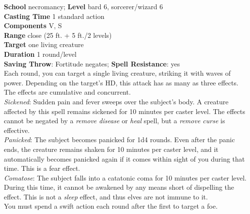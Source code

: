 \textbf{School }necromancy; \textbf{Level }bard 6, sorcerer/wizard 6\\
\textbf{Casting Time }1 standard action\\
\textbf{Components }V, S\\
\textbf{Range }close (25 ft. + 5 ft./2 levels)\\
\textbf{Target }one living creature\\
\textbf{Duration }1 round/level\\
\textbf{Saving Throw}: Fortitude negates; \textbf{Spell Resistance}: yes\\
Each round, you can target a single living creature, striking it with waves of power. Depending on the target's HD, this attack has as many as three effects.\\
The effects are cumulative and concurrent.\\
\textit{Sickened}: Sudden pain and fever sweeps over the subject's body. A creature affected by this spell remains sickened for 10 minutes per caster level. The effects cannot be negated by a \textit{remove disease }or \textit{heal }spell, but a \textit{remove curse }is effective.\\
\textit{Panicked}: The subject becomes panicked for 1d4 rounds. Even after the panic ends, the creature remains shaken for 10 minutes per caster level, and it automatically becomes panicked again if it comes within sight of you during that time. This is a fear effect.\\
\textit{Comatose}: The subject falls into a catatonic coma for 10 minutes per caster level. During this time, it cannot be awakened by any means short of dispelling the effect. This is not a \textit{sleep }effect, and thus elves are not immune to it.\\
You must spend a swift action each round after the first to target a foe.\\
